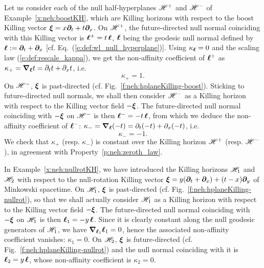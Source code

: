 \begin{example}
\label{x:neh:boostKH_kappa}
Let us consider each of the null half-hyperplanes $\mathscr{H}^+$
and $\mathscr{H}^-$ of Example~\ref{x:neh:boostKH}, which are Killing horizons with
respect to the boost Killing vector $\bm{\xi} = x \bm{\partial}_t + t \bm{\partial}_x$. On
$\mathscr{H}^+$, the future-directed null normal coinciding with this Killing vector
is $\bm{\ell}^+ = t\,  \bm{\ell}$, $\bm{\ell}$ being the geodesic null normal defined by
$\bm{\ell}:= \bm{\partial}_t + \bm{\partial}_x$ [cf. Eq.~(\ref{e:def:wl_null_hyperplane})].
Using $\kappa_{\bm{\ell}} = 0$ and the scaling law (\ref{e:def:rescale_kappa}),
we get the non-affinity
coefficient of $\bm{\ell}^+$ as $\kappa_+= \bm{\nabla}_{\bm{\ell}} t = \partial_t t + \partial_x t$, i.e.
\[
    \kappa_+ = 1 .
\]
On $\mathscr{H}^-$, $\bm{\xi}$ is past-directed (cf. Fig.~\ref{f:neh:hplaneKilling-boost}).
Sticking to future-directed null normals, we shall then consider $\mathscr{H}^-$
as a Killing horizon with respect to the Killing vector field $-\bm{\xi}$.
The future-directed null normal coinciding with $-\bm{\xi}$ on $\mathscr{H}^-$ is then
$\bm{\ell}^- = -t\,  \bm{\ell}$, from which we deduce the non-affinity
coefficient of $\bm{\ell}^-$: $\kappa_-= \bm{\nabla}_{\bm{\ell}} (-t) = \partial_t (-t) + \partial_x (-t)$, i.e.
\[
    \kappa_- = -1 .
\]
We check that $\kappa_+$ (resp.  $\kappa_-$) is constant over the Killing horizon $\mathscr{H}^+$ (resp. $\mathscr{H}^-$), in agreement with Property~\ref{p:neh:zeroth_law}.
\end{example}

\begin{example}
\label{x:neh:nullrotKH_kappa}
In Example~\ref{x:neh:nullrotKH}, we have introduced the Killing horizons
$\mathscr{H}_1$ and $\mathscr{H}_2$ with respect to the null-rotation Killing vector
$\bm{\xi} = y( \bm{\partial}_t + \bm{\partial}_x ) + (t-x)\bm{\partial}_y$ of Minkowski spacetime.
On $\mathscr{H}_1$, $\bm{\xi}$ is past-directed (cf. Fig.~\ref{f:neh:hplaneKilling-nullrot}),
so that we shall actually consider $\mathscr{H}_1$
as a Killing horizon with respect to the Killing vector field $-\bm{\xi}$.
The future-directed null normal coinciding with $-\bm{\xi}$ on $\mathscr{H}_1$ is then
$\bm{\ell}_1 = - y\, \bm{\ell}$. Since it is clearly constant along the null geodesic generators
of $\mathscr{H}_1$, we have $\bm{\nabla}_{\bm{\ell}_1}\bm{\ell}_1 = 0$, hence the
associated non-affinity coefficient vanishes: $\kappa_1 = 0$.
On $\mathscr{H}_2$, $\bm{\xi}$ is future-directed (cf. Fig.~\ref{f:neh:hplaneKilling-nullrot})
and the null normal coinciding with it is $\bm{\ell}_2 =  y\,  \bm{\ell}$, whose non-affinity
coefficient is $\kappa_2 = 0$.
\end{example}

